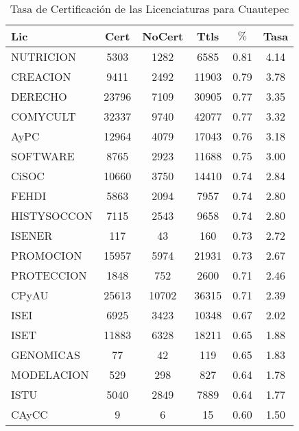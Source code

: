 \documentclass[12pt]{article}
\begin{document}
\begin{table}[h]
\centering
\begin{tabular}{|l|cc|c|cc|}\hline\hline
Lic & Cert & NoCert & Ttls & $\%$ & Tasa \\\hline\hline
NUTRICION & 5303 & 1282 & 6585 & 0.81 & 4.14 \\\hline\hline
CREACION & 9411 & 2492 & 11903 & 0.79 & 3.78 \\
DERECHO & 23796 & 7109 & 30905 & 0.77 & 3.35 \\
COMYCULT & 32337 & 9740 & 42077 & 0.77 & 3.32 \\
AyPC & 12964 & 4079 & 17043 & 0.76 & 3.18 \\
SOFTWARE & 8765 & 2923 & 11688 & 0.75 & 3.00 \\\hline\hline
CiSOC & 10660 & 3750 & 14410 & 0.74 & 2.84 \\
FEHDI & 5863 & 2094 & 7957 & 0.74 & 2.80 \\
HISTYSOCCON & 7115 & 2543 & 9658 & 0.74 & 2.80 \\
ISENER & 117 & 43 & 160 & 0.73 & 2.72 \\
PROMOCION & 15957 & 5974 & 21931 & 0.73 & 2.67 \\\hline\hline
PROTECCION & 1848 & 752 & 2600 & 0.71 & 2.46 \\
CPyAU & 25613 & 10702 & 36315 & 0.71 & 2.39 \\
ISEI & 6925 & 3423 & 10348 & 0.67 & 2.02 \\\hline\hline
ISET & 11883 & 6328 & 18211 & 0.65 & 1.88 \\
GENOMICAS & 77 & 42 & 119 & 0.65 & 1.83 \\
MODELACION & 529 & 298 & 827 & 0.64 & 1.78 \\
ISTU & 5040 & 2849 & 7889 & 0.64 & 1.77 \\
CAyCC & 9 & 6 & 15 & 0.60 & 1.50 \\\hline\hline
\end{tabular}
\caption{Tasa de Certificación de las Licenciaturas para Cuautepec}
\end{table}
\end{document}

